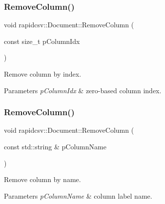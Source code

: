 \subsubsection{\texorpdfstring{Remove\+Column()}{RemoveColumn()}\hspace{0.1cm}{\footnotesize\ttfamily [1/2]}}
{\footnotesize\ttfamily void rapidcsv\+::\+Document\+::\+Remove\+Column (\begin{DoxyParamCaption}\item[{const size\+\_\+t}]{p\+Column\+Idx }\end{DoxyParamCaption})\hspace{0.3cm}{\ttfamily [inline]}}



Remove column by index. 


\begin{DoxyParams}{Parameters}
{\em p\+Column\+Idx} & zero-\/based column index. \\
\hline
\end{DoxyParams}
\mbox{\label{classrapidcsv_1_1Document_acf7432447c7fd1308c3b30ebabea6440}} 
\subsubsection{\texorpdfstring{Remove\+Column()}{RemoveColumn()}\hspace{0.1cm}{\footnotesize\ttfamily [2/2]}}
{\footnotesize\ttfamily void rapidcsv\+::\+Document\+::\+Remove\+Column (\begin{DoxyParamCaption}\item[{const std\+::string \&}]{p\+Column\+Name }\end{DoxyParamCaption})\hspace{0.3cm}{\ttfamily [inline]}}



Remove column by name. 


\begin{DoxyParams}{Parameters}
{\em p\+Column\+Name} & column label name. \\
\hline
\end{DoxyParams}
\mbox{\label{classrapidcsv_1_1Document_adbcc87ce353137b900b135c42213b78e}} 
